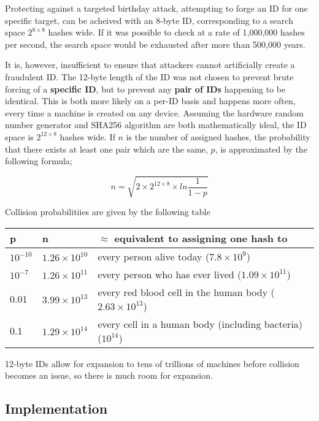 \documentclass{article}
\begin{document}
Protecting against a targeted birthday attack, attempting to forge an ID for one specific target, can be acheived with an 8-byte ID, corresponding to a search space \( 2^{8 \times 8} \) hashes wide. If it was possible to check at a rate of 1,000,000 hashes per second, the search space would be exhausted after more than 500,000 years.

It is, however, insufficient to ensure that attackers cannot artificially create a fraudulent ID. The 12-byte length of the ID was not chosen to prevent brute forcing of a \textbf{specific ID}, but to prevent any \textbf{pair of IDs} happening to be identical. This is both more likely on a per-ID basis and happens more often, every time a machine is created on any device. Assuming the hardware random number generator and SHA256 algorithm are both mathematically ideal, the ID space is \( 2^{12 \times 8} \) hashes wide. If \( n \) is the number of assigned hashes, the probability that there exists at least one pair which are the same, \( p \), is approximated by the following formula\cite{birth};

\[ n = \sqrt{2 \times 2^{12 \times 8} \times ln\frac{1}{1-p}}\]

Collision probabilitiies are given by the following table
\begin{table}[h]
\begin{tabular}{l|l|l}
p				&n							&\( \approx \) equivalent to assigning one hash to \\ \hline
\( 10^{-10}\)	&\( 1.26 \times 10^{10}\)	& every person alive today (\( 7.8 \times 10^{9}\))\\
\( 10^{-7}\)	&\( 1.26 \times 10^{11}\)	& every person who has ever lived (\( 1.09 \times 10^{11}\)) \\
0.01			&\( 3.99 \times 10^{13}\)	& every red blood cell in the human body (\( 2.63 \times 10^{13}\)) \\
0.1				&\( 1.29 \times 10^{14}\)	& every cell in a human body (including bacteria) (\( 10^{14}\))

\end{tabular}
\end{table}
\pagebreak

12-byte IDs allow for expansion to tens of trillions of machines before collision becomes an issue, so there is much room for expansion.

\subsection{Implementation}
\end{document}
